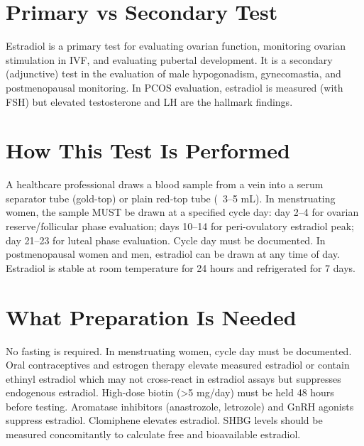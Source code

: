 \section*{Primary vs Secondary Test}
Estradiol is a primary test for evaluating ovarian function, monitoring ovarian stimulation in IVF, and evaluating pubertal development. It is a secondary (adjunctive) test in the evaluation of male hypogonadism, gynecomastia, and postmenopausal monitoring. In PCOS evaluation, estradiol is measured (with FSH) but elevated testosterone and LH are the hallmark findings.

\section*{How This Test Is Performed}
A healthcare professional draws a blood sample from a vein into a serum separator tube (gold-top) or plain red-top tube (~3--5 mL). In menstruating women, the sample MUST be drawn at a specified cycle day: day 2--4 for ovarian reserve/follicular phase evaluation; days 10--14 for peri-ovulatory estradiol peak; day 21--23 for luteal phase evaluation. Cycle day must be documented. In postmenopausal women and men, estradiol can be drawn at any time of day. Estradiol is stable at room temperature for 24 hours and refrigerated for 7 days.

\section*{What Preparation Is Needed}
No fasting is required. In menstruating women, cycle day must be documented. Oral contraceptives and estrogen therapy elevate measured estradiol or contain ethinyl estradiol which may not cross-react in estradiol assays but suppresses endogenous estradiol. High-dose biotin (>5 mg/day) must be held 48 hours before testing. Aromatase inhibitors (anastrozole, letrozole) and GnRH agonists suppress estradiol. Clomiphene elevates estradiol. SHBG levels should be measured concomitantly to calculate free and bioavailable estradiol.

